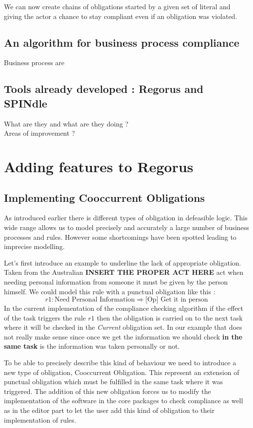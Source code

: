 \documentclass[10pt]{report}
\begin{document}
We can now create chains of obligations started by a given set of literal and giving the actor a chance to stay compliant even if an obligation was violated. \autocite{NormComplianceinBPModeling}

\subsection{An algorithm for business process compliance}
Business process are 



\subsection{Tools already developed : Regorus and SPINdle}
What are they and what are they doing ?\\
Areas of improvement ?


\newpage
\section{Adding features to Regorus}
\subsection{Implementing Cooccurrent Obligations}
As introduced earlier there is different types of obligation in defeasible logic. This wide range allows us to model precisely and accurately a large number of business processes and rules. However some shortcomings have been spotted leading to imprecise modelling.

Let's first introduce an example to underline the lack of appropriate obligation. Taken from the Australian \textbf{INSERT THE PROPER ACT HERE} act when needing personal information from someone it must be given by the person himself. We could model this rule with a punctual obligation like this :
\begin{equation}
r1 : \text{Need Personal Information} \Rightarrow \text{[Op] Get it in person}
\end{equation}
In the current implementation of the compliance checking algorithm if the effect of the task triggers the rule $r1$ then the obligation is carried on to the next task where it will be checked in the \textit{Current} obligation set. In our example that does not really make sense since once we get the information we should check \textbf{in the same task} is the information was taken personally or not.

To be able to precisely describe this kind of behaviour we need to introduce a new type of obligation, Cooccurrent Obligation. This represent an extension of punctual obligation which must be fulfilled in the same task where it was triggered. The addition of this new obligation forces us to modify the implementation of the software in the core packages to check compliance as well as in the editor part to let the user add this kind of obligation to their implementation of rules.
\end{document}
